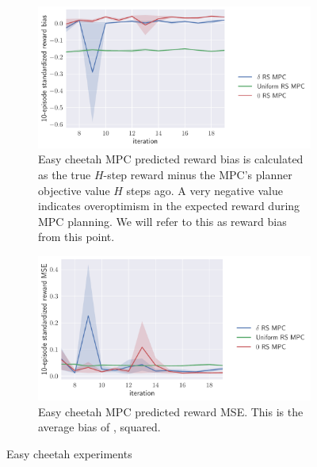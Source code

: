 \documentclass{article}
\begin{document}
\begin{figure}[!ht]
  \vspace{1em}

  \begin{subfigure}[b]{0.48\columnwidth}
    \centering
    \includegraphics[width=\textwidth]{easy-cheetah-reward-bias.pdf}
    \caption{%
      Easy cheetah MPC predicted reward bias is calculated as the true $H$-step
      reward minus the MPC's planner objective value $H$ steps ago. A very
      negative value indicates overoptimism in the expected reward during MPC
      planning. We will refer to this as reward bias from this point.
    }\label{fig:easy-cheetah-bias}
  \end{subfigure}\hspace{1em}
  \begin{subfigure}[b]{0.48\columnwidth}
    \centering
    \includegraphics[width=\textwidth]{easy-cheetah-reward-mse.pdf}
    \caption{%
      Easy cheetah MPC predicted reward MSE. This is the average bias of
      , squared.
    }\label{fig:easy-cheetah-mse}
  \end{subfigure}

  \caption{Easy cheetah experiments}
  \label{fig:easy-cheetah}
\end{figure}
\end{document}
